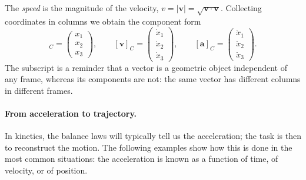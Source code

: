 \documentclass[11pt,a4paper,oneside]{report}
\numberwithin{equation}{chapter}
\newcommand{\vect}[1]{\bm{#1}}
\theoremstyle{plain}
\theoremstyle{definition}
\theoremstyle{remark}
\begin{document}
The \emph{speed} is the magnitude of the velocity, $v=|\vect v|=\sqrt{\vect v\cdot\vect v}$. Collecting
coordinates in columns we obtain the component form
\begin{equation}
  [\vect r]_C=\begin{pmatrix}x_1\\x_2\\x_3\end{pmatrix},\qquad
  [\vect v]_C=\begin{pmatrix}\dot x_1\\\dot x_2\\\dot x_3\end{pmatrix},\qquad
  [\vect a]_C=\begin{pmatrix}\ddot x_1\\\ddot x_2\\\ddot x_3\end{pmatrix}.
\end{equation}
The subscript is a reminder that a vector is a geometric object independent of any frame, whereas its components
are not: the same vector has different columns in different frames.

\paragraph{From acceleration to trajectory.}
In kinetics, the balance laws will typically tell us the acceleration; the task is then to reconstruct the motion.
The following examples show how this is done in the most common situations: the acceleration is known as a function
of time, of velocity, or of position.
\end{document}

